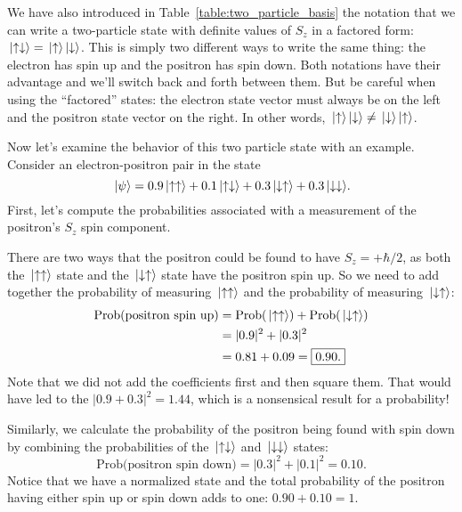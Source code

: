 We have also introduced in Table~\ref{table:two_particle_basis} the
notation that we can write a two-particle state with definite values
of $S_z$ in a factored form: $\,|\mbox{$\uparrow\downarrow$}\rangle =
\,|\mbox{$\uparrow$}\rangle \,|\mbox{$\downarrow$}\rangle$.  This is
simply two different ways to write the same thing: the electron has
spin up and the positron has spin down.  Both notations have their
advantage and we'll switch back and forth between them.  But be
careful when using the ``factored'' states: the electron state vector
must always be on the left and the positron state vector on the right.
In other words, $\,|\mbox{$\uparrow$}\rangle \,|\mbox{$\downarrow$}\rangle \neq
\,|\mbox{$\downarrow$}\rangle \,|\mbox{$\uparrow$}\rangle$.

Now let's examine the behavior of  this two particle state with an
example.  Consider an electron-positron pair in the state
\begin{equation}
\,|\mbox{$\psi$}\rangle = 0.9 \,|\mbox{$\uparrow\uparrow$}\rangle + 0.1\,|\mbox{$\uparrow\downarrow$}\rangle
 + 0.3\,|\mbox{$\downarrow\uparrow$}\rangle + 0.3\,|\mbox{$\downarrow\downarrow$}\rangle.
\label{eq:example_state}
\end{equation}
First, let's compute the probabilities associated with a measurement of the
positron's $S_z$ spin component.

There are two ways that the positron could be found to have
$S_z=+\hbar/2$, as both the $\,|\mbox{$\uparrow\uparrow$}\rangle$ state and the
$\,|\mbox{$\downarrow\uparrow$}\rangle$ state have the positron spin up.  So we
need to add together the probability of measuring $\,|\mbox{$\uparrow\uparrow$}\rangle$
and the probability of measuring $\,|\mbox{$\downarrow\uparrow$}\rangle$:
\begin{align}
\text{Prob(positron spin up)} &= \text{Prob}(\,|\mbox{$\uparrow\uparrow$}\rangle) 
+ \text{Prob}(\,|\mbox{$\downarrow\uparrow$}\rangle) \nonumber\\
 &=|0.9|^2 + |0.3|^2 \nonumber\\ 
 &= 0.81+0.09 = \boxed{0.90.}
\end{align}
Note that we did not add the coefficients first and then square them.
That would have led to the $|0.9+0.3|^2 = 1.44$, which is a nonsensical
result for a probability!

Similarly, we calculate the probability of the positron being found
with spin down by combining the probabilities of the
$\,|\mbox{$\uparrow\downarrow$}\rangle$ and $\,|\mbox{$\downarrow\downarrow$}\rangle$ states:
\begin{equation}
\text{Prob(positron spin down)} = |0.3|^2 + |0.1|^2 = \boxed{0.10.}
\end{equation}
Notice that we have a normalized state and the total probability
of the positron having either spin up or spin down
adds to one: $0.90 + 0.10=1$.

